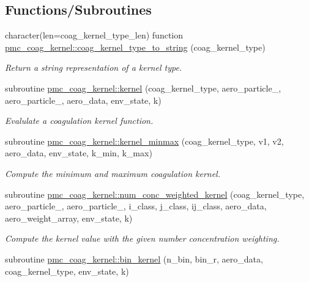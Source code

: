 \subsection*{Functions/\+Subroutines}
\begin{DoxyCompactItemize}
\item 
character(len=coag\+\_\+kernel\+\_\+type\+\_\+len) function \mbox{\hyperlink{namespacepmc__coag__kernel_a936dec49a171f5c431e47fa7c297409b}{pmc\+\_\+coag\+\_\+kernel\+::coag\+\_\+kernel\+\_\+type\+\_\+to\+\_\+string}} (coag\+\_\+kernel\+\_\+type)
\begin{DoxyCompactList}\small\item\em Return a string representation of a kernel type. \end{DoxyCompactList}\item 
subroutine \mbox{\hyperlink{namespacepmc__coag__kernel_aaecec4cf362a3631e2b30f382c62b343}{pmc\+\_\+coag\+\_\+kernel\+::kernel}} (coag\+\_\+kernel\+\_\+type, aero\+\_\+particle\+\_, aero\+\_\+particle\+\_, aero\+\_\+data, env\+\_\+state, k)
\begin{DoxyCompactList}\small\item\em Evalulate a coagulation kernel function. \end{DoxyCompactList}\item 
subroutine \mbox{\hyperlink{namespacepmc__coag__kernel_a5c6cf663a5f3f664e52ed5b979fb9fd3}{pmc\+\_\+coag\+\_\+kernel\+::kernel\+\_\+minmax}} (coag\+\_\+kernel\+\_\+type, v1, v2, aero\+\_\+data, env\+\_\+state, k\+\_\+min, k\+\_\+max)
\begin{DoxyCompactList}\small\item\em Compute the minimum and maximum coagulation kernel. \end{DoxyCompactList}\item 
subroutine \mbox{\hyperlink{namespacepmc__coag__kernel_a346752606a43c3b5348ff3f47a4e0d17}{pmc\+\_\+coag\+\_\+kernel\+::num\+\_\+conc\+\_\+weighted\+\_\+kernel}} (coag\+\_\+kernel\+\_\+type, aero\+\_\+particle\+\_, aero\+\_\+particle\+\_, i\+\_\+class, j\+\_\+class, ij\+\_\+class, aero\+\_\+data, aero\+\_\+weight\+\_\+array, env\+\_\+state, k)
\begin{DoxyCompactList}\small\item\em Compute the kernel value with the given number concentration weighting. \end{DoxyCompactList}\item 
subroutine \mbox{\hyperlink{namespacepmc__coag__kernel_a8e624c7ffea2d3cb1b91778b178240da}{pmc\+\_\+coag\+\_\+kernel\+::bin\+\_\+kernel}} (n\+\_\+bin, bin\+\_\+r, aero\+\_\+data, coag\+\_\+kernel\+\_\+type, env\+\_\+state, k)

\end{DoxyCompactItemize}
